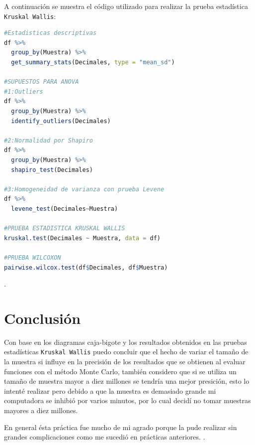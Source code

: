 \documentclass{article}
\begin{document}
A continuación se muestra el código utilizado para realizar la prueba estadística \texttt{Kruskal Wallis}:

\lstset{style=mystyle}
\begin{lstlisting}[language=R, caption= Código para la prueba estadística \texttt{Kruskal Wallis} y la prueba \texttt{Wilcoxon}.]
#Estadisticas descriptivas
df %>%
  group_by(Muestra) %>%
  get_summary_stats(Decimales, type = "mean_sd")

#SUPUESTOS PARA ANOVA
#1:Outliers
df %>%
  group_by(Muestra) %>%
  identify_outliers(Decimales)

#2:Normalidad por Shapiro
df %>%
  group_by(Muestra) %>%
  shapiro_test(Decimales)

#3:Homogeneidad de varianza con prueba Levene
df %>%
  levene_test(Decimales~Muestra)

#PRUEBA ESTADISTICA KRUSKAL WALLIS
kruskal.test(Decimales ~ Muestra, data = df)

#PRUEBA WILCOXON
pairwise.wilcox.test(df$Decimales, df$Muestra)
\end{lstlisting}
\newpage
.
\bigskip

\section{Conclusi\'{o}n}
Con base en los diagramas caja-bigote y los resultados obtenidos en las pruebas estadísticas \texttt{Kruskal Wallis} puedo concluir que el hecho de variar el tamaño de la muestra si influye en la precisión de los resultados que se obtienen al evaluar funciones con el método Monte Carlo, también considero que si se utiliza un tamaño de muestra mayor a diez millones se tendría una mejor presición, esto lo intenté realizar pero debido a que la muestra es demasiado grande mi computadora se inhibió por varios minutos, por lo cual decidí no tomar muestras mayores a diez millones.
\smallskip

En general ésta práctica fue mucho de mi agrado porque la pude realizar sin grandes complicaciones como me sucedió en prácticas anteriores. 
\newpage
.
\bigskip



\end{document}
